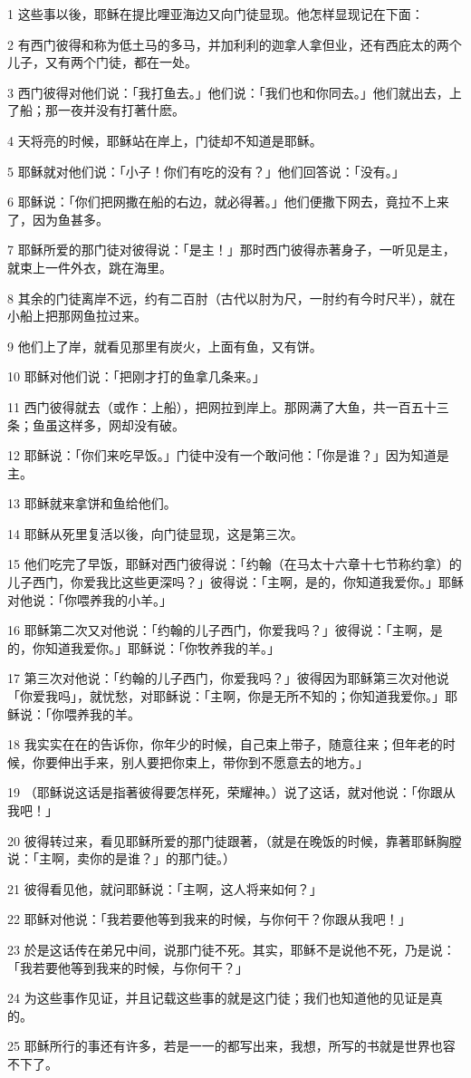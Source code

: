 \par 1 这些事以後，耶稣在提比哩亚海边又向门徒显现。他怎样显现记在下面：
\par 2 有西门彼得和称为低土马的多马，并加利利的迦拿人拿但业，还有西庇太的两个儿子，又有两个门徒，都在一处。
\par 3 西门彼得对他们说：「我打鱼去。」他们说：「我们也和你同去。」他们就出去，上了船；那一夜并没有打著什麽。
\par 4 天将亮的时候，耶稣站在岸上，门徒却不知道是耶稣。
\par 5 耶稣就对他们说：「小子！你们有吃的没有？」他们回答说：「没有。」
\par 6 耶稣说：「你们把网撒在船的右边，就必得著。」他们便撒下网去，竟拉不上来了，因为鱼甚多。
\par 7 耶稣所爱的那门徒对彼得说：「是主！」那时西门彼得赤著身子，一听见是主，就束上一件外衣，跳在海里。
\par 8 其余的门徒离岸不远，约有二百肘（古代以肘为尺，一肘约有今时尺半），就在小船上把那网鱼拉过来。
\par 9 他们上了岸，就看见那里有炭火，上面有鱼，又有饼。
\par 10 耶稣对他们说：「把刚才打的鱼拿几条来。」
\par 11 西门彼得就去（或作：上船），把网拉到岸上。那网满了大鱼，共一百五十三条；鱼虽这样多，网却没有破。
\par 12 耶稣说：「你们来吃早饭。」门徒中没有一个敢问他：「你是谁？」因为知道是主。
\par 13 耶稣就来拿饼和鱼给他们。
\par 14 耶稣从死里复活以後，向门徒显现，这是第三次。
\par 15 他们吃完了早饭，耶稣对西门彼得说：「约翰（在马太十六章十七节称约拿）的儿子西门，你爱我比这些更深吗？」彼得说：「主啊，是的，你知道我爱你。」耶稣对他说：「你喂养我的小羊。」
\par 16 耶稣第二次又对他说：「约翰的儿子西门，你爱我吗？」彼得说：「主啊，是的，你知道我爱你。」耶稣说：「你牧养我的羊。」
\par 17 第三次对他说：「约翰的儿子西门，你爱我吗？」彼得因为耶稣第三次对他说「你爱我吗」，就忧愁，对耶稣说：「主啊，你是无所不知的；你知道我爱你。」耶稣说：「你喂养我的羊。
\par 18 我实实在在的告诉你，你年少的时候，自己束上带子，随意往来；但年老的时候，你要伸出手来，别人要把你束上，带你到不愿意去的地方。」
\par 19 （耶稣说这话是指著彼得要怎样死，荣耀神。）说了这话，就对他说：「你跟从我吧！」
\par 20 彼得转过来，看见耶稣所爱的那门徒跟著，（就是在晚饭的时候，靠著耶稣胸膛说：「主啊，卖你的是谁？」的那门徒。）
\par 21 彼得看见他，就问耶稣说：「主啊，这人将来如何？」
\par 22 耶稣对他说：「我若要他等到我来的时候，与你何干？你跟从我吧！」
\par 23 於是这话传在弟兄中间，说那门徒不死。其实，耶稣不是说他不死，乃是说：「我若要他等到我来的时候，与你何干？」
\par 24 为这些事作见证，并且记载这些事的就是这门徒；我们也知道他的见证是真的。
\par 25 耶稣所行的事还有许多，若是一一的都写出来，我想，所写的书就是世界也容不下了。


